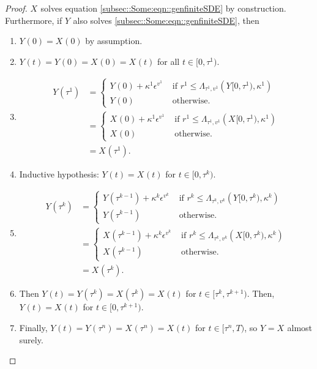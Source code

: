 \documentclass[12pt]{article}
\newcommand{\te}{\text}
\newcommand{\ep}{\epsilon}
\renewcommand{\v}{v}							%
\newcommand{\ev}[1]{\ep^{#1}}					%
\newcommand{\T}{T}								%
\renewcommand{\t}{t}							%
\renewcommand{\r}{r}								%
\newcommand{\rt}[1]{\tau^{#1}}						%
\renewcommand{\it}{k}								%
\newcommand{\numb}{n}								%
\newcommand{\rxvt}[2]{X_{#1}{(#2)}}					%
\newcommand{\rxvtt}[2]{Y_{#1}{(#2)}}				%
\newcommand{\rxvts}[2]{X_{#1}{#2}}					%
\newcommand{\rxvtts}[2]{Y_{#1}{#2}}					%
\newcommand{\ratee}[1]{\Lambda_{#1}}				%
\renewcommand{\mark}[1]{\kappa^{#1}}				%
\begin{document}
\begin{proof}
\(\rxvts{}{}\) solves equation \eqref{subsec::Some:eqn::genfiniteSDE} by construction. Furthermore, if \(\rxvtts{}{}\) also solves \eqref{subsec::Some:eqn::genfiniteSDE}, then 

\begin{enumerate}
\item \(\rxvtt{}{0} = \rxvt{}{0}\) by assumption.

\item \(\rxvtt{}{\t} = \rxvtt{}{0} = \rxvt{}{0} = \rxvt{}{\t}\) for all \(\t\in [0,\rt{1})\).

\item 

\begin{align*}
\rxvtt{}{\rt{1}} &= \begin{cases}
\rxvtt{}{0} + \mark{1}\ev{\v^1} &\te{ if } \r^1 \leq \ratee{\rt{1},\v^1}(\rxvtts{}{[0,\rt{1})},\mark{1})\\
\rxvtt{}{0} &\te{ otherwise.}
\end{cases}\\
&= \begin{cases}
\rxvt{}{0} + \mark{1}\ev{\v^1} &\te{ if } \r^1 \leq \ratee{\rt{1},\v^1}(\rxvts{}{[0,\rt{1})},\mark{1})\\
\rxvt{}{0} &\te{ otherwise.}
\end{cases}\\
&= \rxvt{}{\rt{1}}.
\end{align*}

\item Inductive hypothesis: \(\rxvtt{}{\t} = \rxvt{}{\t}\) for \(\t\in [0,\rt{\it})\). 

\item 

\begin{align*}
\rxvtt{}{\rt{\it}} &= \begin{cases}
\rxvtt{}{\rt{\it-1}} + \mark{\it}\ev{\v^\it} &\te{ if } \r^\it \leq \ratee{\rt{\it},\v^\it}(\rxvtts{}{[0,\rt{\it})},\mark{\it})\\
\rxvtt{}{\rt{\it-1}} &\te{ otherwise.}
\end{cases}\\
&= \begin{cases}
\rxvt{}{\rt{\it-1}} + \mark{\it}\ev{\v^\it} &\te{ if } \r^\it \leq \ratee{\rt{\it},\v^\it}(\rxvts{}{[0,\rt{\it})},\mark{\it})\\
\rxvt{}{\rt{\it-1}} &\te{ otherwise.}
\end{cases}\\
&= \rxvt{}{\rt{\it}}.
\end{align*}

\item Then \(\rxvtt{}{\t} = \rxvtt{}{\rt{\it}} = \rxvt{}{\rt{\it}} = \rxvt{}{\t}\) for \(\t \in [\rt{\it},\rt{\it+1})\). Then, \(\rxvtt{}{\t} = \rxvt{}{\t}\) for \(\t\in [0,\rt{\it+1})\).

\item Finally, \(\rxvtt{}{\t} = \rxvtt{}{\rt{\numb}} = \rxvt{}{\rt{\numb}} = \rxvt{}{\t}\) for \(\t\in [\rt{\numb},\T)\), so \(\rxvtts{}{} = \rxvts{}{}\) almost surely.
\end{enumerate}
\end{proof}
\end{document}
